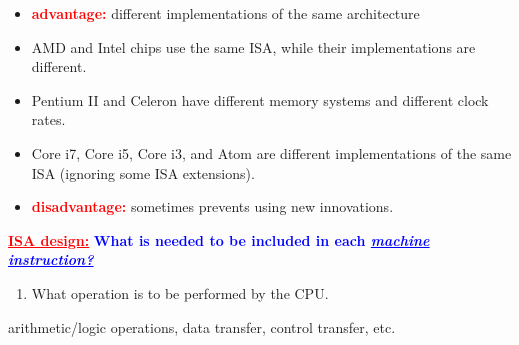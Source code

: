 \documentclass[
  16pt,
  a4paper,
]{report}
\providecommand{\tightlist}{%
  \setlength{\itemsep}{0pt}\setlength{\parskip}{0pt}}\usepackage{longtable,booktabs,array}
\begin{document}
\begin{tcolorbox}[colback=boxbodycol, colframe=boxheadcol, title=Issues with a fixed ISA:, coltitle=boxtitlecol, colbacktitle=boxheadcol]

\begin{itemize}
\tightlist
\item
  \textcolor{red}{\textbf{advantage:}} different implementations of the
  same architecture
\end{itemize}

\begin{tcolorbox}[oversize, left=11pt, right=11pt, colback=boxbodycol2, colframe=boxheadcol2, title=Example, coltitle=boxtitlecol2, colbacktitle=boxheadcol2]

\begin{itemize}
\tightlist
\item
  AMD and Intel chips use the same ISA, while their implementations are
  different.
\item
  Pentium II and Celeron have different memory systems and different
  clock rates.
\item
  Core i7, Core i5, Core i3, and Atom are different implementations of
  the same ISA (ignoring some ISA extensions).
\end{itemize}

\end{tcolorbox}

\begin{itemize}
\tightlist
\item
  \textcolor{red}{\textbf{disadvantage:}} sometimes prevents using new
  innovations.
\end{itemize}

\end{tcolorbox}

\textcolor{red}{\textbf{\underline{ISA design:}}}
\textcolor{blue}{\textbf{What is needed to be included in each \textit{\underline{machine instruction?}}}}

\begin{enumerate}
\def\labelenumi{\arabic{enumi}.}
\tightlist
\item
  What operation is to be performed by the CPU.
\end{enumerate}

\begin{tcolorbox}[colback=boxbodycol, colframe=boxbodycol]
arithmetic/logic operations, data transfer, control transfer, etc.

\end{tcolorbox}
\end{document}
